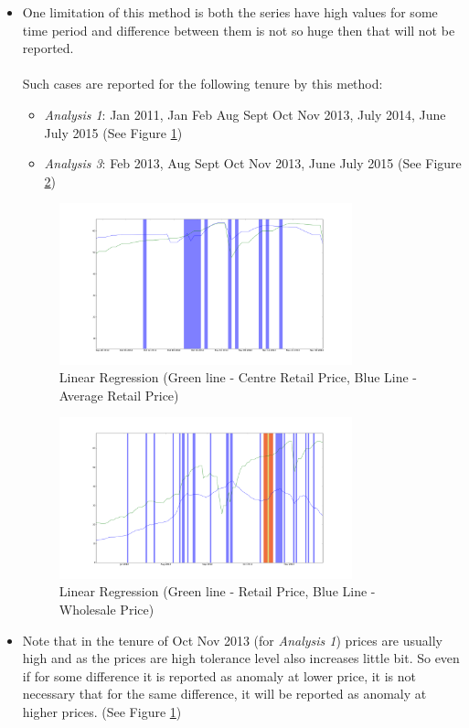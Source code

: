 \documentclass[a4paper,10pt]{report}
\begin{document}
\begin{itemize}
			\item One limitation of this method is both the series have high values for some time period and difference between them is not so huge then that will not be reported.	\\
			\\
			Such cases are reported for the following tenure by this method:
			\begin{itemize}
				\item \textit{Analysis 1}: Jan 2011, Jan Feb Aug Sept Oct Nov 2013, July 2014, June July 2015 (See Figure \ref{fig:12212})
				\item \textit{Analysis 3}: Feb 2013, Aug Sept Oct Nov 2013, June July 2015 (See Figure \ref{fig:12232})
			\end{itemize}
			\begin{figure}[H]
		    	\centering
  		    	\includegraphics[width=0.8\textwidth]{graphs/12212.png}
		    	\caption{Linear Regression (Green line - Centre Retail Price, Blue Line - Average Retail Price)}
		    	\label{fig:12212}
			\end{figure}
			
			\begin{figure}[H]
		    	\centering
  		    	\includegraphics[width=0.8\textwidth]{graphs/12232.png}
		    	\caption{Linear Regression (Green line - Retail Price, Blue Line - Wholesale Price)}
		    	\label{fig:12232}
			\end{figure}
			
					
			
			\item  Note that in the tenure of Oct Nov 2013 (for \textit{Analysis 1}) prices are usually high and as the prices are high tolerance level also increases little bit. So even if for some difference it is reported as anomaly at lower price, it is not necessary that for the same difference, it will be reported as anomaly at higher prices. (See Figure \ref{fig:12212})		
			
		\end{itemize}
		
\end{document}

